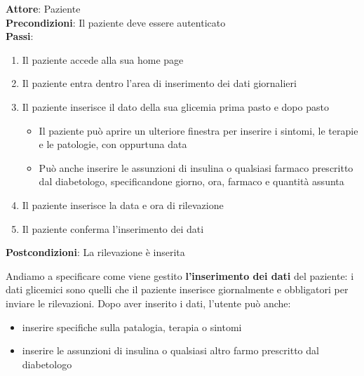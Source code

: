 \documentclass[a4paper]{article}
\begin{document}
\begin{mdframed}
  \textbf{Attore}: Paziente\\
  \textbf{Precondizioni}: Il paziente deve essere autenticato\\
  \textbf{Passi}: 
  \begin{enumerate}[nosep]
    \item Il paziente accede alla sua home page
    \item Il paziente entra dentro l'area di inserimento dei dati giornalieri
    \item  Il paziente inserisce il dato della sua glicemia prima pasto e dopo pasto
    \begin{itemize}
		\item  Il paziente può aprire un ulteriore finestra per inserire i sintomi, le terapie e le patologie, con oppurtuna data 
		\item  Può anche inserire le assunzioni di insulina o qualsiasi farmaco prescritto dal diabetologo, specificandone giorno, ora, farmaco e quantità assunta
	\end{itemize}
	\item Il paziente inserisce la data e ora di rilevazione
	\item Il paziente conferma l'inserimento dei dati
  \end{enumerate}
  \textbf{Postcondizioni}: La rilevazione è inserita 
\end{mdframed}
\noindent
Andiamo a specificare come viene gestito \textbf{l'inserimento dei dati} del paziente: i dati glicemici sono quelli
che il paziente inserisce giornalmente e obbligatori per inviare le rilevazioni. Dopo aver inserito i dati, l'utente può anche:
\begin{itemize}
	\item inserire specifiche sulla patalogia, terapia o sintomi
	\item inserire le assunzioni di insulina o qualsiasi altro farmo prescritto dal diabetologo
\end{itemize}
\end{document}
